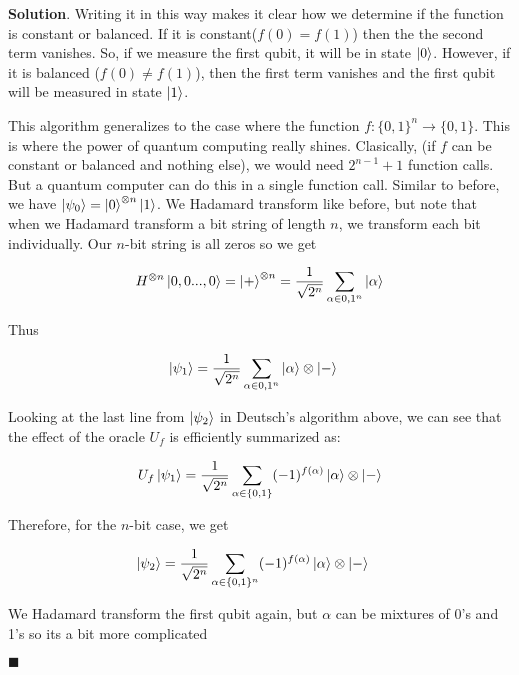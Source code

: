 \documentclass[12pt]{article}
\theoremstyle{definition}
\newenvironment{s}{%
        \begin{trivlist} \item \textbf{Solution}. }{%
            \hspace*{\fill} $\blacksquare$\end{trivlist}}%
\begin{document}
{\begin{s}
Writing it in this way makes it clear how we determine if the function is constant or balanced. If it is constant($f(0)=f(1)$) then the the second term vanishes. So, if we measure the first qubit, it will be in state $\ket{0}$. However, if it is balanced ($f(0)\neq f(1)$), then the first term vanishes and the first qubit will be measured in state $\ket{1}$.

\vspace{0.1in}

This algorithm generalizes to the case where the function $f: \{0,1\}^{n}\rightarrow \{0,1\}$. This is where the power of quantum computing really shines. Clasically, (if $f$ can be constant or balanced and nothing else), we would need $2^{n-1} + 1$ function calls. But a quantum computer can do this in a single function call. Similar to before, we have $\ket{\psi_{0}} = \ket{0}^{\otimes n}\ket{1}$. We Hadamard transform like before, but note that when we Hadamard transform a bit string of length $n$, we transform each bit individually. Our $n$-bit string is all zeros so we get 

\begin{align*}
H^{\otimes n}\ket{0,0...,0} = \ket{+}^{\otimes n} = \frac{1}{\sqrt{2^{n}}}\sum_{\alpha\in{0,1}^{n}}\ket{\alpha}
\end{align*}

Thus

\begin{align*}
\ket{\psi_{1}} &= \frac{1}{\sqrt{2^{n}}}\sum_{\alpha\in{0,1}^{n}}\ket{\alpha}\otimes\ket{-}
\end{align*}

Looking at the last line from $\ket{\psi_{2}}$ in Deutsch's algorithm above, we can see that the effect of the oracle $U_{f}$ is efficiently summarized as:

\begin{align*}
U_{f}\ket{\psi_{1}} = \frac{1}{\sqrt{2^{n}}}\sum_{\alpha\in\{0,1\}} (-1)^{f(\alpha)}\ket{\alpha}\otimes\ket{-}
\end{align*}

Therefore, for the $n$-bit case, we get

\begin{align*}
\ket{\psi_{2}} &= \frac{1}{\sqrt{2^{n}}} \sum_{\alpha\in\{0,1\}^{n}} (-1)^{f(\alpha)}\ket{\alpha}\otimes \ket{-}
\end{align*}

We Hadamard transform the first qubit again, but $\alpha$ can be mixtures of 0's and 1's so its a bit more complicated


\end{s}}
\end{document}
